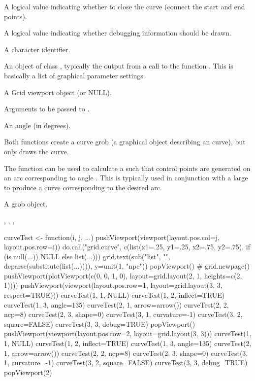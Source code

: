 \begin{Arguments}
\begin{ldescription}
\item[\code{open}] A logical value indicating whether to close the curve
(connect the start and end points).
\item[\code{debug}] A logical value indicating whether debugging
information should be drawn.
\item[\code{name}]  A character identifier. 
\item[\code{gp}] An object of class , typically the output
from a call to the function .  This is basically
a list of graphical parameter settings.
\item[\code{vp}] A Grid viewport object (or NULL).
\item[\code{...}] Arguments to be passed to .
\item[\code{theta}] An angle (in degrees).
\end{ldescription}
\end{Arguments}
%
\begin{Details}\relax
Both functions create a curve grob (a graphical object describing an
curve), but only 
draws the curve.

The  function can be used to calculate a
 such that control points are generated on
an arc corresponding to angle .  This is typically
used in conjunction with a large  to produce a curve
corresponding to the desired arc.
\end{Details}
%
\begin{Value}
A grob object.
\end{Value}
%
\begin{SeeAlso}\relax
{},
,
,
\end{SeeAlso}
%
\begin{Examples}
\begin{ExampleCode}
curveTest <- function(i, j, ...) {
  pushViewport(viewport(layout.pos.col=j, layout.pos.row=i))
  do.call("grid.curve", c(list(x1=.25, y1=.25, x2=.75, y2=.75),
          if (is.null(...)) NULL else list(...)))
  grid.text(sub("list", "", deparse(substitute(list(...)))),
            y=unit(1, "npc"))
  popViewport()
}
# grid.newpage()
pushViewport(plotViewport(c(0, 0, 1, 0),
                          layout=grid.layout(2, 1, heights=c(2, 1))))
pushViewport(viewport(layout.pos.row=1,
                      layout=grid.layout(3, 3, respect=TRUE)))
curveTest(1, 1, NULL)
curveTest(1, 2, inflect=TRUE)
curveTest(1, 3, angle=135)
curveTest(2, 1, arrow=arrow())
curveTest(2, 2, ncp=8)
curveTest(2, 3, shape=0)
curveTest(3, 1, curvature=-1)
curveTest(3, 2, square=FALSE)
curveTest(3, 3, debug=TRUE)
popViewport()
pushViewport(viewport(layout.pos.row=2,
                      layout=grid.layout(3, 3)))
curveTest(1, 1, NULL)
curveTest(1, 2, inflect=TRUE)
curveTest(1, 3, angle=135)
curveTest(2, 1, arrow=arrow())
curveTest(2, 2, ncp=8)
curveTest(2, 3, shape=0)
curveTest(3, 1, curvature=-1)
curveTest(3, 2, square=FALSE)
curveTest(3, 3, debug=TRUE)
popViewport(2)
\end{ExampleCode}
\end{Examples}
